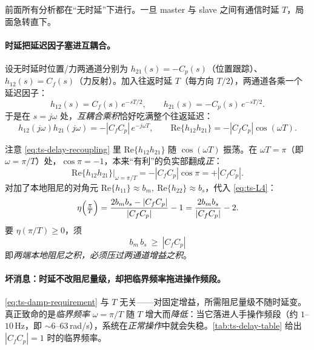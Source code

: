 前面所有分析都在“无时延”下进行。一旦 master 与 slave 之间有通信时延 $T$，局面急转直下。

\paragraph{时延把延迟因子塞进互耦合。}
设无时延时位置/力两通道分别为 $h_{21}(s)=-C_p(s)$（位置跟踪）、$h_{12}(s)=C_f(s)$（力反射）。加入往返时延 $T$（每方向 $T/2$），两通道各乘一个延迟因子：
\begin{equation}
  h_{12}(s)=C_f(s)\,e^{-sT/2},\qquad h_{21}(s)=-C_p(s)\,e^{-sT/2}.
  \label{eq:ts-delay-channels}
\end{equation}
于是在 $s=j\omega$ 处，\emph{互耦合乘积}恰好吃满整个往返延迟：
\begin{equation}
  h_{12}(j\omega)h_{21}(j\omega)=-|C_fC_p|\,e^{-j\omega T},\qquad
  \mathrm{Re}\{h_{12}h_{21}\}=-|C_fC_p|\cos(\omega T).
  \label{eq:ts-delay-recoupling}
\end{equation}

\begin{derivation}[临界频率 $\omega=\pi/T$：余弦翻号]
注意 \cref{eq:ts-delay-recoupling} 里 $\mathrm{Re}\{h_{12}h_{21}\}$ 随 $\cos(\omega T)$ 振荡。在 $\omega T=\pi$（即 $\omega=\pi/T$）处，$\cos\pi=-1$，本来“有利”的负实部翻成\emph{正}：
\[
  \mathrm{Re}\{h_{12}h_{21}\}\big|_{\omega=\pi/T}=-|C_fC_p|\cos\pi=+|C_fC_p|.
\]
对加了本地阻尼的对角元 $\mathrm{Re}\{h_{11}\}\approx b_m,\ \mathrm{Re}\{h_{22}\}\approx b_s$，代入 \cref{eq:ts-L4}：
\begin{equation}
  \eta\Bigl(\tfrac{\pi}{T}\Bigr)=\frac{2b_mb_s-|C_fC_p|}{|C_fC_p|}-1=\frac{2b_mb_s}{|C_fC_p|}-2.
  \label{eq:ts-eta-critical}
\end{equation}
要 $\eta(\pi/T)\ge0$，须
\begin{equation}
  \boxed{\;b_m\,b_s\ \ge\ |C_fC_p|\;}
  \label{eq:ts-damp-requirement}
\end{equation}
即\emph{两端本地阻尼之积，必须压过两通道增益之积}。
\end{derivation}

\paragraph{坏消息：时延不改阻尼量级，却把临界频率拖进操作频段。}
\cref{eq:ts-damp-requirement} 与 $T$ 无关——对固定增益，所需阻尼量级不随时延变。真正致命的是\emph{临界频率} $\omega=\pi/T$ 随 $T$ 增大而\emph{降低}：当它落进人手操作频段（约 $1$--$10\,$Hz，即 $\sim6$--$63\,$rad/s），系统在\emph{正常操作}中就会失稳。\cref{tab:ts-delay-table} 给出 $|C_fC_p|=1$ 时的临界频率。

